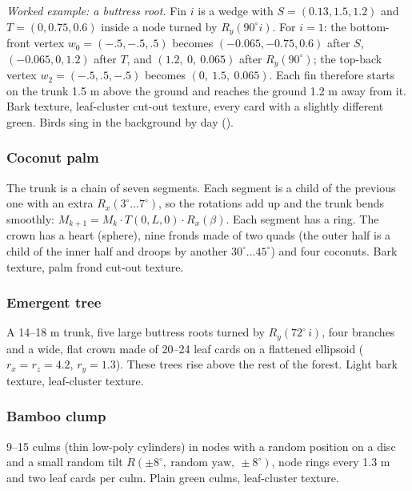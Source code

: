 \emph{Worked example: a buttress root.} Fin $i$ is a wedge with $S=(0.13,1.5,1.2)$ and $T=(0,0.75,0.6)$ inside a
node turned by $R_y(90^\circ i)$. For $i=1$: the bottom-front vertex $w_0=(-.5,-.5,.5)$ becomes $(-0.065,-0.75,0.6)$
after $S$, $(-0.065,0,1.2)$ after $T$, and $(1.2,\ 0,\ 0.065)$ after $R_y(90^\circ)$; the top-back vertex
$w_2=(-.5,.5,-.5)$ becomes $(0,\ 1.5,\ 0.065)$. Each fin therefore starts on the trunk 1.5 m above the ground and
reaches the ground 1.2 m away from it.
 Bark texture, leaf-cluster cut-out texture, every card with a slightly
different green. Birds sing in the background by day ().

\subsubsection{Coconut palm}
 The trunk is a chain of seven segments. Each segment is a child of the previous one with
an extra $R_x(3^\circ\ldots7^\circ)$, so the rotations add up and the trunk bends smoothly:
$M_{k+1} = M_k\cdot T(0,L,0)\cdot R_x(\beta)$. Each segment has a ring. The crown has a heart (sphere), nine fronds made
of two quads (the outer half is a child of the inner half and droops by another $30^\circ\ldots45^\circ$) and four coconuts.
 Bark texture, palm frond cut-out texture.

\subsubsection{Emergent tree}
 A 14--18 m trunk, five large buttress roots turned by $R_y(72^\circ\,i)$, four branches and
a wide, flat crown made of 20--24 leaf cards on a flattened ellipsoid ($r_x=r_z=4.2$, $r_y=1.3$). These trees
rise above the rest of the forest.
 Light bark texture, leaf-cluster texture.

\subsubsection{Bamboo clump}
 9--15 culms (thin low-poly cylinders) in nodes with a random position on a disc and a
small random tilt $R(\pm8^\circ,\ \text{random yaw},\ \pm8^\circ)$, node rings every 1.3 m and two leaf cards per culm.
 Plain green culms, leaf-cluster texture.

